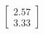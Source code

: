 \documentclass[preview]{standalone}
\begin{document}
\begin{align*}
\begin{bmatrix} 2.57 \\ 3.33 \end{bmatrix}
\end{align*}
\end{document}
